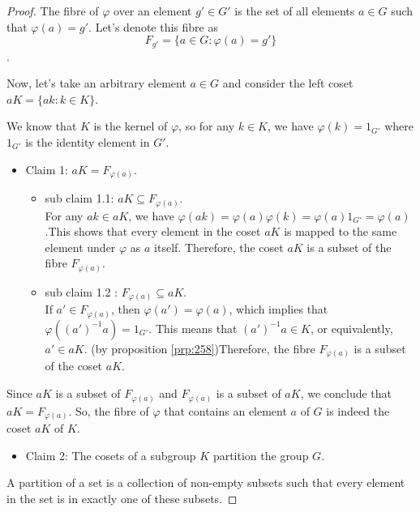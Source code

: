 \documentclass[
]{book}
\providecommand{\tightlist}{%
  \setlength{\itemsep}{0pt}\setlength{\parskip}{0pt}}
\theoremstyle{definition}
\theoremstyle{definition}
\theoremstyle{definition}
\theoremstyle{definition}
\theoremstyle{remark}
\begin{document}
\begin{proof}
The fibre of \(\varphi\) over an element \(g' \in G'\) is the set of all elements \(a \in G\) such that \(\varphi(a) = g'\). Let's denote this fibre as
\[F_{g'} = \{a \in G : \varphi(a) = g'\}\].

Now, let's take an arbitrary element \(a \in G\) and consider the left coset \(aK = \{ak : k \in K\}\).

We know that \(K\) is the kernel of \(\varphi\), so for any \(k \in K\), we have \(\varphi(k) = 1_{G'}\) where \(1_{G'}\) is the identity element in \(G'\).

\begin{itemize}
\tightlist
\item
  Claim 1: \(aK=F_{\varphi(a)}\).

  \begin{itemize}
  \item
    sub claim 1.1: \(aK \subseteq F_{\varphi(a)}\).\\
    For any \(ak \in aK\), we have \(\varphi(ak) = \varphi(a)\varphi(k) = \varphi(a)1_{G'} = \varphi(a)\).This shows that every element in the coset \(aK\) is mapped to the same element under \(\varphi\) as \(a\) itself. Therefore, the coset \(aK\) is a subset of the fibre \(F_{\varphi(a)}\).
  \item
    sub claim 1.2 : \(F_{\varphi(a)}\subseteq aK\).\\
    If \(a' \in F_{\varphi(a)}\), then \(\varphi(a') = \varphi(a)\), which implies that \(\varphi((a')^{-1}a) = 1_{G'}\).
    This means that \((a')^{-1}a \in K\), or equivalently, \(a' \in aK\). (by proposition \ref{prp:258})Therefore, the fibre \(F_{\varphi(a)}\) is a subset of the coset \(aK\).
  \end{itemize}
\end{itemize}

Since \(aK\) is a subset of \(F_{\varphi(a)}\) and \(F_{\varphi(a)}\) is a subset of \(aK\), we conclude that \(aK = F_{\varphi(a)}\). So, the fibre of \(\varphi\) that contains an element \(a\) of \(G\) is indeed the coset \(aK\) of \(K\).

\begin{itemize}
\tightlist
\item
  Claim 2: The cosets of a subgroup \(K\) partition the group \(G\).
\end{itemize}

A partition of a set is a collection of non-empty subsets such that every element in the set is in exactly one of these subsets.


\end{proof}
\end{document}
